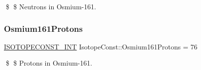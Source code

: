 \$ \$ Neutrons in Osmium-\/161. \mbox{\label{group___isotope_const-_osmium-_os161_ga28c015e0b41ce576733863864d61b3ca}} 
\subsubsection{\texorpdfstring{Osmium161\+Protons}{Osmium161Protons}}
{\footnotesize\ttfamily \mbox{\hyperlink{group___isotope_const-_macros_ga5f18360b3e99483a35c32d789e62621c}{I\+S\+O\+T\+O\+P\+E\+C\+O\+N\+S\+T\+\_\+\+I\+NT}} Isotope\+Const\+::\+Osmium161\+Protons = 76}

\$ \$ Protons in Osmium-\/161. 